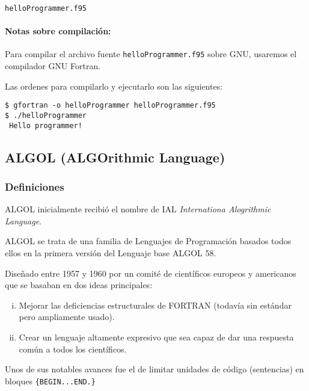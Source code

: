 \prog \texttt{helloProgrammer.f95}



\paragraph*{Notas sobre compilación:} Para compilar el archivo fuente
\texttt{helloProgrammer.f95} sobre GNU, usaremos el compilador GNU Fortran. 

Las ordenes para compilarlo y ejecutarlo son las siguientes:

\begin{verbatim}
$ gfortran -o helloProgrammer helloProgrammer.f95 
$ ./helloProgrammer 
 Hello programmer!
\end{verbatim}

\subsection{ALGOL (ALGOrithmic Language)}

\subsubsection{Definiciones}

 {}ALGOL inicialmente recibió el nombre de IAL \textit{Internationa
Alogrithmic Language}.

 ALGOL se trata de una familia de Lenguajes de Programación basados todos
ellos en la primera versión del Lenguaje base ALGOL 58.

{
 Diseñado entre 1957 y 1960 por un comité de científicos europeos y
americanos que se basaban en dos ideas principales:

\begin{enumerate}[i.]

\item Mejorar las deficiencias estructurales de FORTRAN (todavía sin estándar
pero ampliamente usado).

\item Crear un lenguaje altamente expresivo que sea capaz de dar una respuesta
común a todos los científicos.

\end{enumerate}
}

{\cor Unos de sus notables avances fue el de limitar unidades de código
(sentencias) en bloques} \texttt{\{BEGIN...END.\}}

